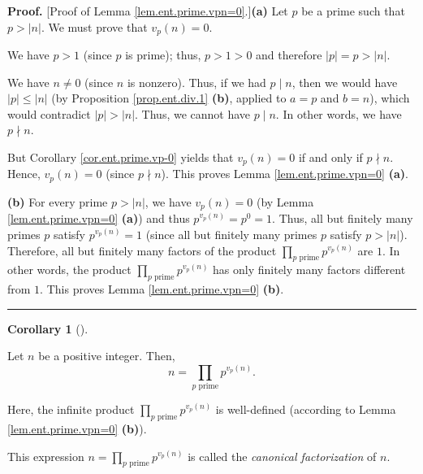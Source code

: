 \documentclass[numbers=enddot,12pt,final,onecolumn,notitlepage]{scrartcl}%
\numberwithin{exer}{subsection}
\theoremstyle{definition}
\newtheorem{coro}[theo]{Corollary}
\newenvironment{corollary}[1][]
{\begin{coro}[#1]\begin{leftbar}}
{\end{leftbar}\end{coro}}
\newenvironment{proof}[1][Proof]{\noindent\textbf{#1.} }{\ \rule{0.5em}{0.5em}}
\let\prodnonlimits\prod
\renewcommand{\prod}{\prodnonlimits\limits}
\begin{document}
\begin{proof}
[Proof of Lemma \ref{lem.ent.prime.vpn=0}.]\textbf{(a)} Let $p$ be a prime
such that $p>\left\vert n\right\vert $. We must prove that $v_{p}\left(
n\right)  =0$.

We have $p>1$ (since $p$ is prime); thus, $p>1>0$ and therefore $\left\vert
p\right\vert =p>\left\vert n\right\vert $.

We have $n\neq0$ (since $n$ is nonzero). Thus, if we had $p\mid n$, then we
would have $\left\vert p\right\vert \leq\left\vert n\right\vert $ (by
Proposition \ref{prop.ent.div.1} \textbf{(b)}, applied to $a=p$ and $b=n$),
which would contradict $\left\vert p\right\vert >\left\vert n\right\vert $.
Thus, we cannot have $p\mid n$. In other words, we have $p\nmid n$.

But Corollary \ref{cor.ent.prime.vp-0} yields that $v_{p}\left(  n\right)  =0$
if and only if $p\nmid n$. Hence, $v_{p}\left(  n\right)  =0$ (since $p\nmid
n$). This proves Lemma \ref{lem.ent.prime.vpn=0} \textbf{(a)}.

\textbf{(b)} For every prime $p>\left\vert n\right\vert $, we have
$v_{p}\left(  n\right)  =0$ (by Lemma \ref{lem.ent.prime.vpn=0} \textbf{(a)})
and thus $p^{v_{p}\left(  n\right)  }=p^{0}=1$. Thus, all but finitely many
primes $p$ satisfy $p^{v_{p}\left(  n\right)  }=1$ (since all but finitely
many primes $p$ satisfy $p>\left\vert n\right\vert $). Therefore, all but
finitely many factors of the product $\prod_{p\text{ prime}}p^{v_{p}\left(
n\right)  }$ are $1$. In other words, the product $\prod_{p\text{ prime}%
}p^{v_{p}\left(  n\right)  }$ has only finitely many factors different from
$1$. This proves Lemma \ref{lem.ent.prime.vpn=0} \textbf{(b)}.
\end{proof}

\begin{corollary}
\label{cor.ent.prime.can-fac}Let $n$ be a positive integer. Then,%
\[
n=\prod_{p\text{ prime}}p^{v_{p}\left(  n\right)  }.
\]


Here, the infinite product $\prod_{p\text{ prime}}p^{v_{p}\left(  n\right)  }$
is well-defined (according to Lemma \ref{lem.ent.prime.vpn=0} \textbf{(b)}).
\end{corollary}

This expression $n=\prod_{p\text{ prime}}p^{v_{p}\left(  n\right)  }$ is
called the \textit{canonical factorization} of $n$.
\end{document}
